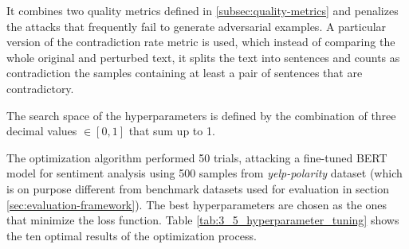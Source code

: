 It combines two quality metrics defined in \ref{subsec:quality-metrics} and penalizes the attacks that frequently fail to generate adversarial examples.
A particular version of the contradiction rate metric is used, which instead of comparing the whole original and perturbed text, it splits the text into sentences and counts as contradiction the samples containing at least a pair of sentences that are contradictory.

The search space of the hyperparameters is defined by the combination of three decimal values $\in [0, 1]$ that sum up to 1.

The optimization algorithm performed 50 trials, attacking a fine-tuned BERT model for sentiment analysis using 500 samples from \emph{yelp-polarity} \cite{zhang2015characterlevel} dataset (which is on purpose different from benchmark datasets used for evaluation in section \ref{sec:evaluation-framework}).
The best hyperparameters are chosen as the ones that minimize the loss function.
Table \ref{tab:3_5_hyperparameter_tuning} shows the ten optimal results of the optimization process.
\\
\\
\\
